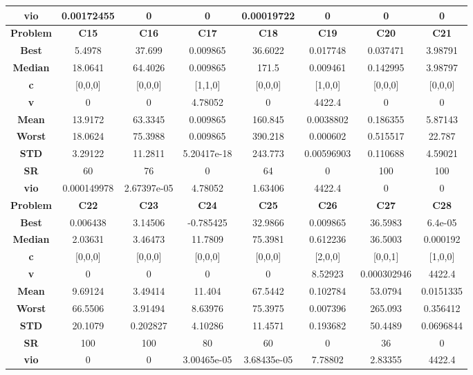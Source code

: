 \documentclass{IEEEtran}
\begin{document}
\begin{center}
\begin{tabular}{|c|c|c|c|c|c|c|c|}
    \textbf{vio} & 0.00172455 & 0 & 0 & 0.00019722 & 0 & 0 & 0\\ 
    \hline 
    \hline 
    \textbf{Problem} & \textbf{C15} & \textbf{C16} & \textbf{C17} & \textbf{C18} & \textbf{C19} & \textbf{C20} & \textbf{C21} \\ 
    \hline\hline 
    \textbf{Best} & 5.4978 & 37.699 & 0.009865 & 36.6022 & 0.017748 & 0.037471 & 3.98791\\ 
    \textbf{Median} & 18.0641 & 64.4026 & 0.009865 & 171.5 & 0.009461 & 0.142995 & 3.98797\\ 
    \textbf{c} & [0,0,0] & [0,0,0] & [1,1,0] & [0,0,0] & [1,0,0] & [0,0,0] & [0,0,0]\\ 
    \textbf{v} & 0 & 0 & 4.78052 & 0 & 4422.4 & 0 & 0\\ 
    \textbf{Mean} & 13.9172 & 63.3345 & 0.009865 & 160.845 & 0.0038802 & 0.186355 & 5.87143\\ 
    \textbf{Worst} & 18.0624 & 75.3988 & 0.009865 & 390.218 & 0.000602 & 0.515517 & 22.787\\ 
    \textbf{STD} & 3.29122 & 11.2811 & 5.20417e-18 & 243.773 & 0.00596903 & 0.110688 & 4.59021\\ 
    \textbf{SR} & 60 & 76 & 0 & 64 & 0 & 100 & 100\\ 
    \textbf{vio} & 0.000149978 & 2.67397e-05 & 4.78052 & 1.63406 & 4422.4 & 0 & 0\\ 
    \hline 
    \hline 
    \textbf{Problem} & \textbf{C22} & \textbf{C23} & \textbf{C24} & \textbf{C25} & \textbf{C26} & \textbf{C27} & \textbf{C28} \\ 
    \hline\hline 
    \textbf{Best} & 0.006438 & 3.14506 & -0.785425 & 32.9866 & 0.009865 & 36.5983 & 6.4e-05\\ 
    \textbf{Median} & 2.03631 & 3.46473 & 11.7809 & 75.3981 & 0.612236 & 36.5003 & 0.000192\\ 
    \textbf{c} & [0,0,0] & [0,0,0] & [0,0,0] & [0,0,0] & [2,0,0] & [0,0,1] & [1,0,0]\\ 
    \textbf{v} & 0 & 0 & 0 & 0 & 8.52923 & 0.000302946 & 4422.4\\ 
    \textbf{Mean} & 9.69124 & 3.49414 & 11.404 & 67.5442 & 0.102784 & 53.0794 & 0.0151335\\ 
    \textbf{Worst} & 66.5506 & 3.91494 & 8.63976 & 75.3975 & 0.007396 & 265.093 & 0.356412\\ 
    \textbf{STD} & 20.1079 & 0.202827 & 4.10286 & 11.4571 & 0.193682 & 50.4489 & 0.0696844\\ 
    \textbf{SR} & 100 & 100 & 80 & 60 & 0 & 36 & 0\\ 
    \textbf{vio} & 0 & 0 & 3.00465e-05 & 3.68435e-05 & 7.78802 & 2.83355 & 4422.4\\ 
    \hline 
  \end{tabular}
\end{center}
\end{document}
